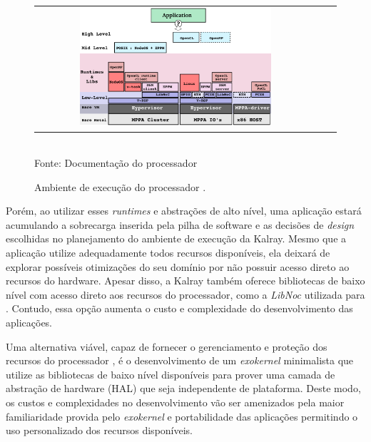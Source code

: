 \documentclass[
	12pt,				%
	openright,			%
	twoside,			%
	a4paper,			%
	english,			%
	brazil,				%
	]{abntex2}
\begin{document}
\begin{figure}[t]
	\begin{center}
    	\caption{Ambiente de execução do processador \mppa.}
           \label{figruntime}
		\begin{tabular}{ccc}
			\includegraphics[width=0.7\textwidth]{figs/software_stack.png} \\
		\end{tabular}
      \vspace{1ex} \\
      Fonte: Documentação do processador \mppa
     \end{center}
   \vspace{-2ex}
\end{figure}


Porém, ao utilizar esses \textit{runtimes} e abstrações de alto nível, uma aplicação estará acumulando a sobrecarga inserida pela pilha de software e as decisões de \textit{design} escolhidas no planejamento do ambiente de execução da Kalray.
Mesmo que a aplicação utilize adequadamente todos recursos disponíveis, ela deixará de explorar possíveis otimizações do seu domínio por não possuir acesso direto ao recursos do hardware.
Apesar disso, a Kalray também oferece bibliotecas de baixo nível com acesso direto aos recursos do processador, como a \textit{LibNoc} utilizada para \ipc.
Contudo, essa opção aumenta o custo e complexidade do desenvolvimento das aplicações.

Uma alternativa viável, capaz de fornecer o gerenciamento e proteção dos recursos do processador \mppa, é o desenvolvimento de um \textit{exokernel} minimalista que utilize as bibliotecas de baixo nível disponíveis para prover uma camada de abstração de hardware (HAL)
que seja independente de plataforma.
Deste modo, os custos e complexidades no desenvolvimento vão ser amenizados pela maior familiaridade provida pelo \textit{exokernel} e portabilidade das aplicações permitindo o uso personalizado dos recursos disponíveis.
\end{document}
